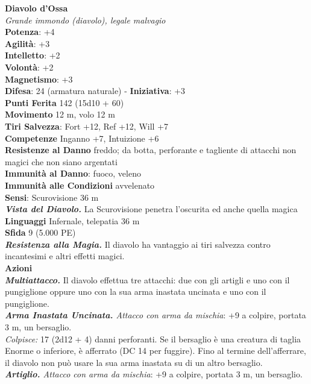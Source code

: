 \begin{multicols}{2}
\medskip\textbf{Diavolo d'Ossa}\\
\emph{Grande immondo (diavolo), legale malvagio}\\
\textbf{Potenza}: +4\\
\textbf{Agilità}: +3\\
\textbf{Intelletto}: +2\\
\textbf{Volontà}: +2\\
\textbf{Magnetismo}: +3\\
\textbf{Difesa}: 24 (armatura naturale) - \textbf{Iniziativa}: +3\\
\textbf{Punti Ferita} 142 (15d10 + 60)\\
\textbf{Movimento} 12 m, volo 12 m\\
\textbf{Tiri Salvezza}: Fort +12, Ref +12, Will +7\\
\textbf{Competenze} Inganno +7, Intuizione +6\\
\textbf{Resistenze al Danno} freddo; da botta, perforante e tagliente di attacchi non magici che non siano argentati\\
\textbf{Immunità al Danno}: fuoco, veleno\\
\textbf{Immunità alle Condizioni} avvelenato\\
\textbf{Sensi}: Scurovisione 36 m\\
\emph{\textbf{Vista del Diavolo.}} La Scurovisione penetra l'oscurita ed anche quella magica\\
\textbf{Linguaggi} Infernale, telepatia 36 m \\
\textbf{Sfida} 9 (5.000 PE)\smallskip\\
\emph{\textbf{Resistenza alla Magia.}} Il diavolo ha vantaggio ai tiri salvezza contro incantesimi e altri effetti magici.\\
\smallskip\textbf{Azioni}\\
\emph{\textbf{Multiattacco.}} Il diavolo effettua tre attacchi: due con gli artigli e uno con il pungiglione oppure uno con la sua arma inastata uncinata e uno con il pungiglione.\\
\emph{\textbf{Arma Inastata Uncinata.} Attacco con arma da mischia}: +9 a colpire, portata 3 m, un bersaglio.\\
\emph{Colpisce:} 17 (2d12 + 4) danni perforanti. Se il bersaglio è una creatura di taglia Enorme o inferiore, è afferrato (DC 14 per fuggire). Fino al termine dell'afferrare, il diavolo non può usare la sua arma inastata su di un altro bersaglio.\\
\emph{\textbf{Artiglio.} Attacco con arma da mischia}: +9 a colpire, portata 3 m, un bersaglio.\\

\end{multicols}
